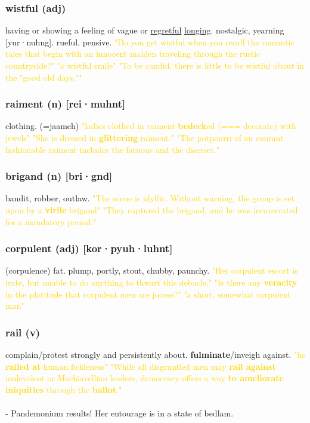 \documentclass{proc}
\begin{document}
	\subsubsection{\textcolor{brickred}{wistful} (adj)}
	having or showing a feeling of vague or \underline{regretful} \underline{longing}. nostalgic, yearning [yur·nuhng]. rueful. pensive.
	\textcolor{gold}{"Do you get wistful when you recall the romantic tales that begin with an innocent maiden traveling through the rustic countryside?" "a wistful smile" "To be candid, there is little to be wistful about in the "good old days.""}
	
	\subsubsection{\textcolor{brickred}{raiment} (n) [rei·muhnt]}
	clothing. (=jaameh)
	\textcolor{gold}{"ladies clothed in raiment \textbf{bedeck}ed (=== decorate) with jewels" "She is dressed in \textbf{glittering} raiment." "The potpourri of au courant fashionable raiment includes the fatuous and the discreet."}
	
	\subsubsection{\textcolor{brickred}{brigand} (n) [bri·gnd]}
	bandit,
	robber,
	outlaw.
	\textcolor{gold}{"The scene is idyllic. Without warning, the group is set upon by a \textbf{virile} brigand" "They captured the brigand, and he was incarcerated for a mandatory period."}
	
	\subsubsection{\textcolor{brickred}{corpulent} (adj) [kor·pyuh·luhnt]}
	(corpulence) fat. plump, portly, stout, chubby, paunchy.
	\textcolor{gold}{"Her corpulent escort is irate, but unable to do anything to thwart this debacle." "Is there any \textbf{veracity} in the platitude that corpulent men are jocose?" "a short, somewhat corpulent man"}
	
	\subsubsection{\textcolor{brickred}{rail} (v)}
	complain/protest strongly and persistently about. \textbf{fulminate}/inveigh against.
	\textcolor{gold}{"he \textbf{railed at} human fickleness" "While all disgruntled men may \textbf{rail against} malevolent or Machiavellian leaders, democracy offers a way \textbf{to ameliorate iniquities} through the \textbf{ballot}."}\\\\
	- Pandemonium results! Her entourage is in a state of bedlam.
	
\end{document}
